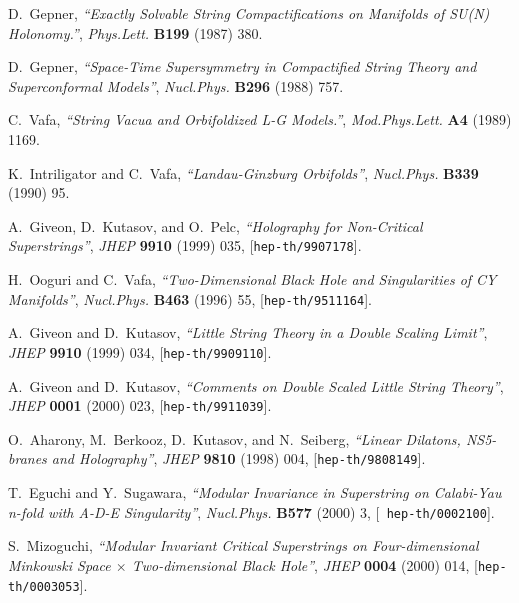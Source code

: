 \documentclass[a4paper,12pt]{article}
\numberwithin{equation}{section}
\begin{document}
\newpage
\providecommand{\href}[2]{#2}\begingroup\raggedright\begin{thebibliography}{10}

D.~Gepner, {\it ``{Exactly Solvable String Compactifications on Manifolds of
  SU(N) Holonomy.}''},  {\em Phys.Lett.} {\bf B199} (1987) 380.

D.~Gepner, {\it ``{Space-Time Supersymmetry in Compactified String Theory and
  Superconformal Models}''},  {\em Nucl.Phys.} {\bf B296} (1988) 757.

C.~Vafa, {\it ``{String Vacua and Orbifoldized L-G Models.}''},  {\em
  Mod.Phys.Lett.} {\bf A4} (1989) 1169.

K.~Intriligator and C.~Vafa, {\it ``{Landau-Ginzburg Orbifolds}''},  {\em
  Nucl.Phys.} {\bf B339} (1990) 95.

A.~Giveon, D.~Kutasov, and O.~Pelc, {\it ``{Holography for Non-Critical
  Superstrings}''},  {\em JHEP} {\bf 9910} (1999) 035,
  [\href{http://xxx.lanl.gov/abs/hep-th/9907178}{{\tt hep-th/9907178}}].

H.~Ooguri and C.~Vafa, {\it ``{Two-Dimensional Black Hole and Singularities of
  CY Manifolds}''},  {\em Nucl.Phys.} {\bf B463} (1996) 55,
  [\href{http://xxx.lanl.gov/abs/hep-th/9511164}{{\tt hep-th/9511164}}].

A.~Giveon and D.~Kutasov, {\it ``{Little String Theory in a Double Scaling
  Limit}''},  {\em JHEP} {\bf 9910} (1999) 034,
  [\href{http://xxx.lanl.gov/abs/hep-th/9909110}{{\tt hep-th/9909110}}].

A.~Giveon and D.~Kutasov, {\it ``{Comments on Double Scaled Little String
  Theory}''},  {\em JHEP} {\bf 0001} (2000) 023,
  [\href{http://xxx.lanl.gov/abs/hep-th/9911039}{{\tt hep-th/9911039}}].

O.~Aharony, M.~Berkooz, D.~Kutasov, and N.~Seiberg, {\it ``{Linear Dilatons,
  NS5-branes and Holography}''},  {\em JHEP} {\bf 9810} (1998) 004,
  [\href{http://xxx.lanl.gov/abs/hep-th/9808149}{{\tt hep-th/9808149}}].

T.~Eguchi and Y.~Sugawara, {\it ``{Modular Invariance in Superstring on
  Calabi-Yau n-fold with A-D-E Singularity}''},  {\em Nucl.Phys.} {\bf B577}
  (2000) 3, [\href{http://xxx.lanl.gov/abs/hep-th/0002100}{{\tt
  hep-th/0002100}}].

S.~Mizoguchi, {\it ``{Modular Invariant Critical Superstrings on
  Four-dimensional Minkowski Space $\times$ Two-dimensional Black Hole}''},
  {\em JHEP} {\bf 0004} (2000) 014,
  [\href{http://xxx.lanl.gov/abs/hep-th/0003053}{{\tt hep-th/0003053}}].


\end{thebibliography}
\end{document}
